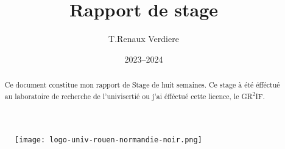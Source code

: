\documentclass[12pt]{article}
\title{Rapport de stage}
\author{T.Renaux Verdiere}
\date{2023--2024}
\begin{document}
\begin{figure}
    \texttt{[image: logo-univ-rouen-normandie-noir.png]}
\end{figure}

\maketitle

\begin{abstract}
    Ce document constitue mon rapport de Stage de huit semaines. Ce stage à été
    éfféctué au laboratoire de recherche de l'univisertié ou j'ai éfféctué cette  
    licence, le GR\textsuperscript{2}IF.  
\end{abstract}

\newpage   

\tableofcontents

\newpage







\newpage

\printbibliography
\end{document}

